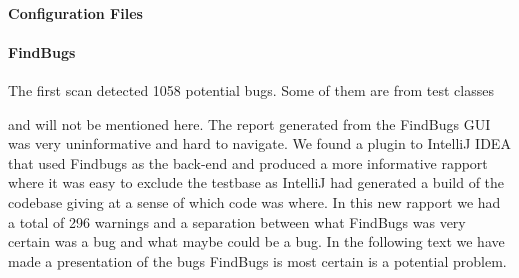 \documentclass{article}
\begin{document}
\paragraph{Configuration Files}  

\paragraph{FindBugs}

  The first scan detected 1058 potential bugs. Some of them are from test classes

  and will not be mentioned here. The report generated from the FindBugs GUI was
  very uninformative and hard to navigate. We found a plugin to IntelliJ IDEA
  that used Findbugs as the back-end and produced a more informative rapport
  where it was easy to exclude the testbase as IntelliJ had generated a build of the
  codebase giving at a sense of which code was where. In this new rapport we
  had a total of 296 warnings and a separation between what FindBugs was very
  certain was a bug and what maybe could be a bug. In the following text we have
  made a presentation of the bugs FindBugs is most certain is a potential
  problem.
\end{document}
